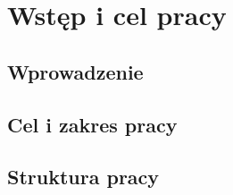 \chapter{Wstęp i cel pracy}
\label{chap:wstep}

\section{Wprowadzenie}

\section{Cel i zakres pracy}

\section{Struktura pracy}
